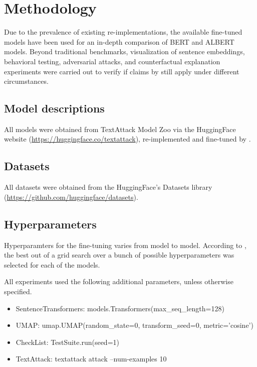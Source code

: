 \documentclass{article}
\begin{document}
\section{Methodology}


Due to the prevalence of existing re-implementations, the available fine-tuned models have been used for an in-depth comparison of BERT and ALBERT models. Beyond traditional benchmarks, visualization of sentence embeddings, behavioral testing, adversarial attacks, and counterfactual explanation experiments were carried out to verify if claims by \citet{Lan2020ALBERT} still apply under different circumstances.

\subsection{Model descriptions}

All models were obtained from TextAttack Model Zoo via the HuggingFace website (\url{https://huggingface.co/textattack}), re-implemented and fine-tuned by \citet{Morris2020TextAttackAF}.

\subsection{Datasets}

All datasets were obtained from the HuggingFace's Datasets library (\url{https://github.com/huggingface/datasets}).

\subsection{Hyperparameters}

Hyperparamters for the fine-tuning varies from model to model. According to \citet{Morris2020TextAttackAF}, the best out of a grid search over a bunch of possible hyperparameters was selected for each of the models.

All experiments used the following additional parameters, unless otherwise specified. 

\begin{itemize}
  \item SentenceTransformers: models.Transformers(max\_seq\_length=128)
  \item UMAP: umap.UMAP(random\_state=0, transform\_seed=0, metric='cosine')
  \item CheckList: TestSuite.run(seed=1)
  \item TextAttack: textattack attack --num-examples 10
\end{itemize}
\end{document}
